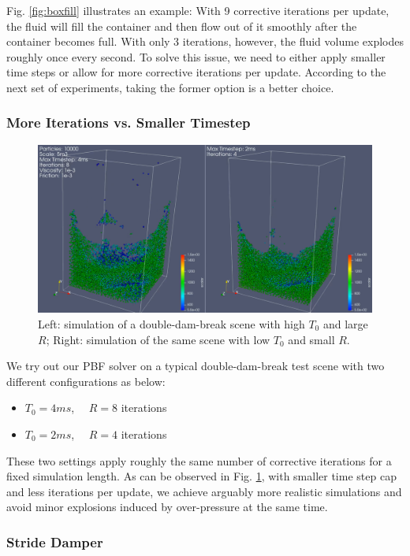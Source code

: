 \documentclass[
	11pt, 
	DIV10,
	ngerman,
	a4paper, 
	oneside, 
	headings=normal, 
	captions=tableheading,
	final, 
	numbers=noenddot
]{scrartcl}
\begin{document}
Fig. \ref{fig:boxfill} illustrates an example: With 9 corrective iterations per update, the fluid will fill the container and then flow out of it smoothly after the container becomes full. With only 3 iterations, however, the fluid volume explodes roughly once every second. To solve this issue, we need to either apply smaller time steps or allow for more corrective iterations per update. According to the next set of experiments, taking the former option is a better choice.

\subsubsection{More Iterations vs. Smaller Timestep}

\begin{figure}
    \centering
    \includegraphics[width=.6\textwidth]{pics/pbf_iter_ts.png}
    \caption{Left: simulation of a double-dam-break scene with high $ T_{0} $ and large $ R $; Right: simulation of the same scene with low $ T_{0} $ and small $ R $.}
    \label{fig:doubleDam}
\end{figure}

We try out our PBF solver on a typical double-dam-break test scene with two different configurations as below:

\begin{itemize}
    \item $ T_{0} = 4ms $, $ \quad R = 8 $ iterations
    \item $ T_{0} = 2ms $, $ \quad R = 4 $ iterations
\end{itemize}

These two settings apply roughly the same number of corrective iterations for a fixed simulation length. As can be observed in Fig. \ref{fig:doubleDam}, with smaller time step cap and less iterations per update, we achieve arguably more realistic simulations and avoid minor explosions induced by over-pressure at the same time.

\subsubsection{Stride Damper}
\end{document}
